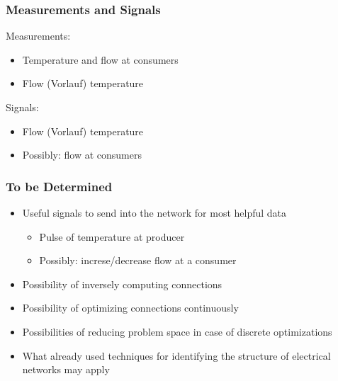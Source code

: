 \documentclass{beamer}
\begin{document}
\begin{frame}
\frametitle{Measurements and Signals}
  Measurements:
  \begin{itemize}
    \item Temperature and flow at consumers
    \item Flow (Vorlauf) temperature
  \end{itemize}

  \vspace{2em}

  Signals:
  \begin{itemize}
    \item Flow (Vorlauf) temperature
    \item Possibly: flow at consumers
  \end{itemize}
\end{frame}

\begin{frame}
\frametitle{To be Determined}
  \begin{itemize}
    \item Useful signals to send into the network for most helpful data
      \begin{itemize}
        \item Pulse of temperature at producer
        \item Possibly: increse/decrease flow at a consumer
      \end{itemize}
    \item Possibility of inversely computing connections
    \item Possibility of optimizing connections continuously
    \item Possibilities of reducing problem space in case of discrete optimizations
      \vspace{1em}
    \item What already used techniques for identifying the structure of electrical networks may apply
  \end{itemize}
\end{frame}
\end{document}
